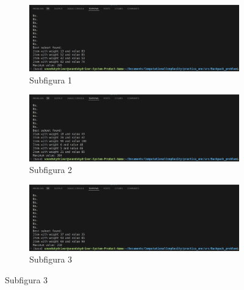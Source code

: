 \documentclass{article}
\begin{document}
\begin{figure}[H]  %
    \centering
    \begin{subfigure}{0.7\textwidth}
        \centering
        \includegraphics[width=\textwidth]{../images/Screenshot from 2024-09-19 23-04-13.png}
        \caption{Subfigura 1}
        \label{fig:subfig1}
    \end{subfigure}
    \hfill
    \begin{subfigure}{0.7\textwidth}
        \centering
        \includegraphics[width=\textwidth]{../images/Screenshot from 2024-09-19 23-03-51.png}
        \caption{Subfigura 2}
        \label{fig:subfig2}
    \end{subfigure}
    \hfill
    \begin{subfigure}{0.7\textwidth}
        \centering
        \includegraphics[width=\textwidth]{../images/Screenshot from 2024-09-19 23-03-59.png}
        \caption{Subfigura 3}
        \label{fig:subfig3}
    \end{subfigure}

    \vspace{10pt}  %


\end{figure}
\end{document}
